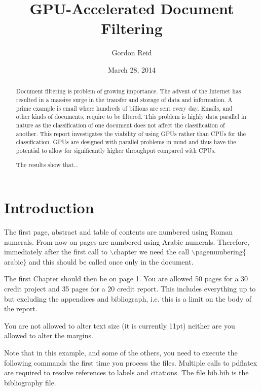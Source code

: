 \documentclass{l4proj}
\begin{document}
\title{GPU-Accelerated Document Filtering}
\author{Gordon Reid}
\date{March 28, 2014}
\maketitle

\begin{abstract}
Document filtering is problem of growing importance. The advent of the Internet
has resulted in a massive surge in the transfer and storage of data and
information. A prime example is email where hundreds of billions are sent every
day. Emails, and other kinds of documents, require to be filtered. This problem
is highly data parallel in nature as the classification of one document does
not affect the classification of another. This report investigates the viability
of using GPUs rather than CPUs for the classification. GPUs are designed with
parallel problems in mind and thus have the potential to allow for significantly
higher throughput compared with CPUs.

The results show that...
\end{abstract}

\educationalconsent

\tableofcontents

\chapter{Introduction}
The first page, abstract and table of contents are numbered using Roman numerals. From now on pages are numbered
using Arabic numerals. Therefore, immediately after the first call to $\backslash$chapter we need the call
$\backslash$pagenumbering$\{$arabic$\}$ and this should be called once only in the document.

The first Chapter should then be on page 1. You are allowed 50 pages for a 30 credit project and 35 pages for a
20 credit report. This includes everything up to but excluding the appendices and bibliograph, i.e. this is a limit on
the body of the report.

You are not allowed to alter text size (it is currently 11pt) neither are you allowed to alter the margins.

Note that in this example, and some of the others, you need to execute the following commands the first time you process the files.
Multiple calls to pdflatex are required to resolve references to labels and citations. The file bib.bib is the bibliography file.
\end{document}
